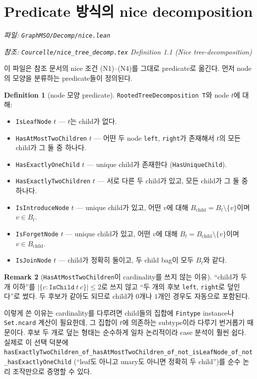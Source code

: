 \documentclass[11pt]{article}
\theoremstyle{definition}
\newtheorem{definition}{Definition}[section]
\newtheorem{remark}[definition]{Remark}
\theoremstyle{plain}
\newcommand{\lean}[1]{\texttt{#1}}
\newcommand{\leanfile}[1]{\texttt{#1}}
\begin{document}
\section{Predicate 방식의 nice decomposition}
\label{nice:sec:predicate}

\emph{파일: \leanfile{GraphMSO/Decomp/nice.lean}}

\emph{참조: \leanfile{Courcelle/nice\_tree\_decomp.tex} Definition 1.1
(Nice tree-decomposition)}

이 파일은 참조 문서의 nice 조건 (N1)--(N4)를 그대로 predicate로 옮긴다.
먼저 node의 모양을 분류하는 predicate들이 정의된다.

\begin{definition}[node 모양 predicate]
\label{nice:def:nodeshapes}
\lean{RootedTreeDecomposition T}와 node $t$에 대해:
\begin{itemize}
  \item \lean{IsLeafNode} $t$ --- $t$는 child가 없다.
  \item \lean{HasAtMostTwoChildren} $t$ --- 어떤 두 node
    \lean{left}, \lean{right}가 존재해서 $t$의 모든 child가 그 둘 중 하나다.
  \item \lean{HasExactlyOneChild} $t$ --- unique child가 존재한다
    (\lean{HasUniqueChild}).
  \item \lean{HasExactlyTwoChildren} $t$ --- 서로 다른 두 child가 있고, 모든
    child가 그 둘 중 하나다.
  \item \lean{IsIntroduceNode} $t$ --- unique child가 있고, 어떤 $v$에 대해
    $B_{\text{child}} = B_t \setminus \{v\}$이며 $v \in B_t$.
  \item \lean{IsForgetNode} $t$ --- unique child가 있고, 어떤 $v$에 대해
    $B_t = B_{\text{child}} \setminus \{v\}$이며 $v \in B_{\text{child}}$.
  \item \lean{IsJoinNode} $t$ --- child가 정확히 둘이고, 두 child bag이
    모두 $B_t$와 같다.
\end{itemize}
\end{definition}

\begin{remark}[\lean{HasAtMostTwoChildren}이 cardinality를 쓰지 않는 이유]
\label{nice:rem:atmosttwo}
``child가 두 개 이하''를 $|\{c : \lean{IsChild}\ t\ c\}| \le 2$로 쓰지 않고
``두 개의 후보 \lean{left}, \lean{right}로 덮인다''로 썼다. 두 후보가 같아도
되므로 child가 $0$개나 $1$개인 경우도 자동으로 포함된다.

이렇게 쓴 이유는 cardinality를 다루려면 child들의 집합에 \lean{Fintype}
instance나 \lean{Set.ncard} 계산이 필요한데, 그 집합이 $t$에 의존하는
subtype이라 다루기 번거롭기 때문이다. 후보 두 개로 덮는 형태는 순수하게
일차 논리적이라 case 분석이 훨씬 쉽다. 실제로 이 선택 덕분에
\lean{hasExactlyTwoChildren\_of\_hasAtMostTwoChildren\_of\_not\_isLeafNode\_of\_not\_hasExactlyOneChild}
(``leaf도 아니고 unary도 아니면 정확히 두 child'')를 순수 논리 조작만으로
증명할 수 있다.
\end{remark}
\end{document}
